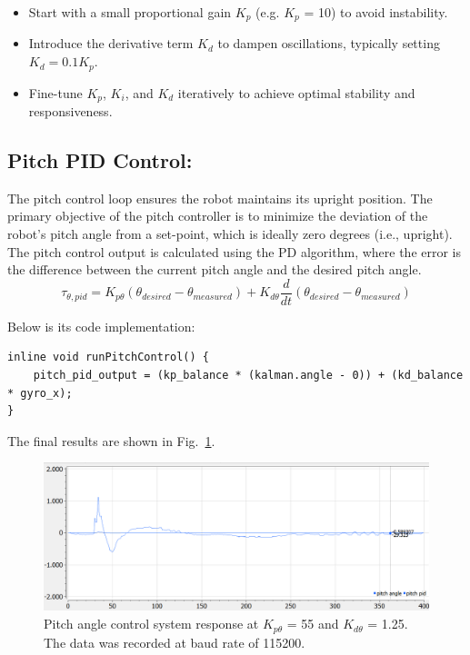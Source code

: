 \begin{itemize}
	\item Start with a small proportional gain $K_p$ (e.g. $K_p$ = 10) to avoid instability.
	\item Introduce the derivative term $K_d$ to dampen oscillations, typically setting $K_d = 0.1K_p$.
	\item  Fine-tune $K_p$, $K_i$, and $K_d$ iteratively to achieve optimal stability and responsiveness.
\end{itemize}


\subsection{Pitch PID Control:}
The pitch control loop ensures the robot maintains its upright position. The primary objective of the pitch controller is to minimize the deviation of the robot's pitch angle from a set-point, which is ideally zero degrees (i.e., upright). The pitch control output is calculated using the PD algorithm, where the error is the difference between the current pitch angle and the desired pitch angle. 
\begin{equation}
	\tau_{\theta,pid} = K_{p\theta}({\theta_{desired} - \theta_{measured}}) + K_{d\theta}\frac{d}{dt}(\theta_{desired} - \theta_{measured})
\end{equation}

Below is its code implementation:
\begin{lstlisting}[style=cppstyle2]
inline void runPitchControl() {
	pitch_pid_output = (kp_balance * (kalman.angle - 0)) + (kd_balance * gyro_x);
}
\end{lstlisting}

The final results are shown in Fig.~\ref{fig:pid_position_kp_55_kd_1_25}.
\begin{figure}[H]
	\centering
	\includegraphics[width=0.8\linewidth]{assets/pid_pitch_kp_55_kd_1_25.png}
	\caption{Pitch angle control system response at $K_{p\theta}$ = 55 and $K_{d\theta}$ = 1.25. The data was recorded at baud rate of 115200.}
	\label{fig:pid_position_kp_55_kd_1_25}
\end{figure}


